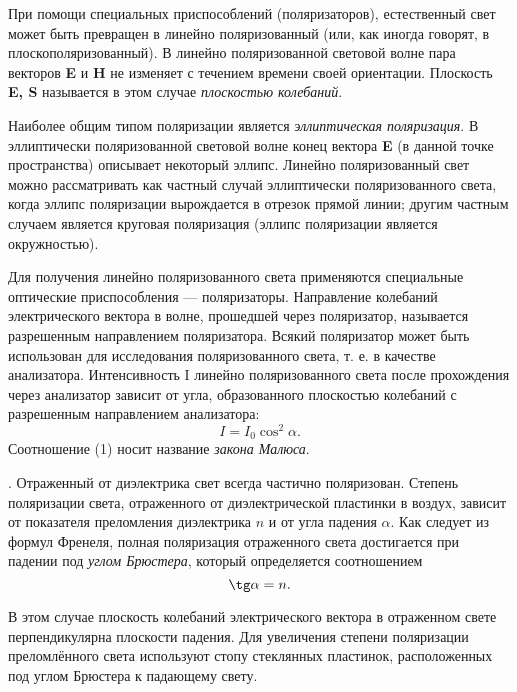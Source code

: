 При помощи специальных приспособлений (поляризаторов), естественный свет может быть превращен в линейно поляризованный (или, как иногда говорят, в плоскополяризованный). В линейно поляризованной световой волне пара векторов \textbf{E} и \textbf{H} не изменяет с течением времени своей ориентации. Плоскость \textbf{E, S} называется в этом случае \textit{плоскостью колебаний}. \par
Наиболее общим типом поляризации является \textit{эллиптическая поляризация}. В эллиптически поляризованной световой волне конец вектора
\textbf{E} (в данной точке пространства) описывает некоторый эллипс. Линейно
поляризованный свет можно рассматривать как частный случай эллиптически поляризованного света, когда эллипс поляризации вырождается в отрезок прямой линии; другим частным случаем является круговая
поляризация (эллипс поляризации является окружностью). \par
Для получения линейно поляризованного света применяются специальные оптические приспособления — поляризаторы. Направление колебаний электрического вектора в волне, прошедшей через поляризатор, называется
разрешенным направлением поляризатора.
Всякий поляризатор может быть использован для исследования поляризованного света, т. е. в качестве анализатора. Интенсивность I линейно поляризованного света после прохождения через анализатор зависит от угла, образованного плоскостью колебаний с разрешенным направлением анализатора:
\begin{equation}
  I = I_0 \cos^2\alpha.
\end{equation}
Соотношение (1) носит название \textit{закона Малюса}. \par
. Отраженный от диэлектрика свет всегда частично поляризован. Степень поляризации света, отраженного от диэлектрической пластинки в воздух, зависит от показателя преломления диэлектрика $n$ и от угла падения $\alpha$. Как следует из формул Френеля, полная поляризация отраженного света достигается
при падении под \textit{углом Брюстера}, который определяется соотношением
\begin{equation}
 \tg \alpha = n.
\end{equation}

В этом случае плоскость колебаний электрического вектора в отраженном свете перпендикулярна плоскости падения. Для увеличения степени поляризации преломлённого
света используют стопу стеклянных пластинок, расположенных под углом Брюстера к падающему свету.


